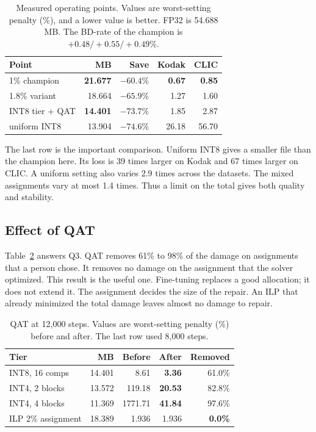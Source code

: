 \documentclass[10pt,twocolumn]{article}
\newcommand{\best}[1]{\textbf{#1}}
\begin{document}
\begin{table}[t]
\centering
\footnotesize
\setlength{\tabcolsep}{3pt}
\caption{Measured operating points. Values are worst-setting penalty (\%), and a lower value is better.
FP32 is 54.688 MB. The BD-rate of the champion is $+0.48/+0.55/+0.49\%$.}
\label{tab:frontier}
\begin{tabular}{lrrrr}
\toprule
Point & MB & Save & Kodak & CLIC \\
\midrule
1\% champion      & \best{21.677} & $-60.4\%$ & \best{0.67} & \best{0.85} \\
1.8\% variant     & 18.664 & $-65.9\%$ & 1.27 & 1.60 \\
INT8 tier + QAT   & \best{14.401} & $-73.7\%$ & 1.85 & 2.87 \\
\midrule
uniform INT8      & 13.904 & $-74.6\%$ & 26.18 & 56.70 \\
\bottomrule
\end{tabular}
\end{table}

The last row is the important comparison. Uniform INT8 gives a smaller file than the champion here. Its loss
is 39 times larger on Kodak and 67 times larger on CLIC. A uniform setting also varies 2.9 times across
the datasets. The mixed assignments vary at most 1.4 times. Thus a limit on the total gives both
quality and stability.

\subsection{Effect of QAT}
Table~\ref{tab:qat} answers Q3. QAT removes 61\% to 98\% of the damage on assignments that a person
chose. It removes no damage on the assignment that the solver optimized. This result is the useful one.
Fine-tuning replaces a good allocation; it does not extend it. The assignment decides the size of the
repair. An ILP that already minimized the total damage leaves almost no damage to repair.

\begin{table}[t]
\centering
\footnotesize
\setlength{\tabcolsep}{3pt}
\caption{QAT at 12{,}000 steps. Values are worst-setting penalty (\%) before and after. The last row
used 8{,}000 steps.}
\label{tab:qat}
\begin{tabular}{lrrrr}
\toprule
Tier & MB & Before & After & Removed \\
\midrule
INT8, 16 comps    & 14.401 & 8.61 & \best{3.36} & 61.0\% \\
INT4, 2 blocks    & 13.572 & 119.18 & \best{20.53} & 82.8\% \\
INT4, 4 blocks    & 11.369 & 1771.71 & \best{41.84} & 97.6\% \\
ILP 2\% assignment & 18.389 & 1.936 & 1.936 & \best{0.0\%} \\
\bottomrule
\end{tabular}
\end{table}
\end{document}
